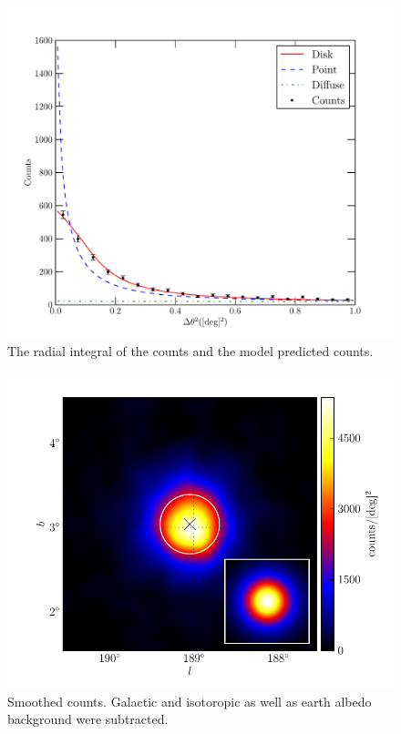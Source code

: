 \documentclass[12pt,preprint]{aastex}
\begin{document}
\clearpage
\begin{figure}
  \begin{center}
    \includegraphics{ic443_plots/ic443_radial_integral.pdf}
    \caption{The radial integral of the counts and the model predicted counts.
    }
    \label{radial_profile}
  \end{center}
\end{figure}

\clearpage
\begin{figure}
  \begin{center}
    \includegraphics{ic443_plots/ic443_smoothed_counts.pdf}
    \caption{Smoothed counts. Galactic and isotoropic as well as earth albedo background were subtracted.
    }
    \label{smoothed_counts}
  \end{center}
\end{figure}
\end{document}
